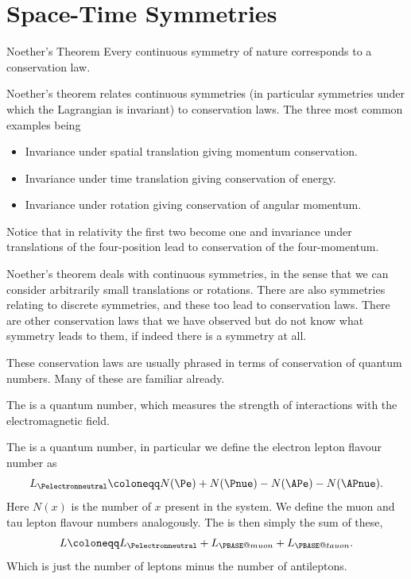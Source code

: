 \documentclass[fleqn]{NotesClass}
\makeatletter
\newcommand{\Pmuonneutral}{\ensuremath{\PBASE@muon}}
\newcommand{\Ptauneutral}{\ensuremath{\PBASE@tauon}}
\makeatother
\begin{document}
    \section{Space-Time Symmetries}
    \begin{thm}{Noether's Theorem}{}
        Every continuous symmetry of nature corresponds to a conservation law.
    \end{thm}
    Noether's theorem relates continuous symmetries (in particular symmetries under which the Lagrangian is invariant) to conservation laws.
    The three most common examples being
    \begin{itemize}
        \item Invariance under spatial translation giving momentum conservation.
        \item Invariance under time translation giving conservation of energy.
        \item Invariance under rotation giving conservation of angular momentum.
    \end{itemize}
    Notice that in relativity the first two become one and invariance under translations of the four-position lead to conservation of the four-momentum.
    
    Noether's theorem deals with continuous symmetries, in the sense that we can consider arbitrarily small translations or rotations.
    There are also symmetries relating to discrete symmetries, and these too lead to conservation laws.
    There are other conservation laws that we have observed but do not know what symmetry leads to them, if indeed there is a symmetry at all.
    
    These conservation laws are usually phrased in terms of conservation of quantum numbers.
    Many of these are familiar already.
    
    The  is a quantum number, which measures the strength of interactions with the electromagnetic field.
    
    The  is a quantum number, in particular we define the electron lepton flavour number as
    \begin{equation}
        L_{\Pelectronneutral} \coloneqq N(\Pe) + N(\Pnue) - N(\APe) - N(\APnue).
    \end{equation}
    Here \(N(x)\) is the number of \(x\) present in the system.
    We define the muon and tau lepton flavour numbers analogously.
    The  is then simply the sum of these,
    \begin{equation}
        L \coloneqq L_{\Pelectronneutral} + L_{\Pmuonneutral} + L_{\Ptauneutral}.
    \end{equation}
    Which is just the number of leptons minus the number of antileptons.
    
\end{document}
